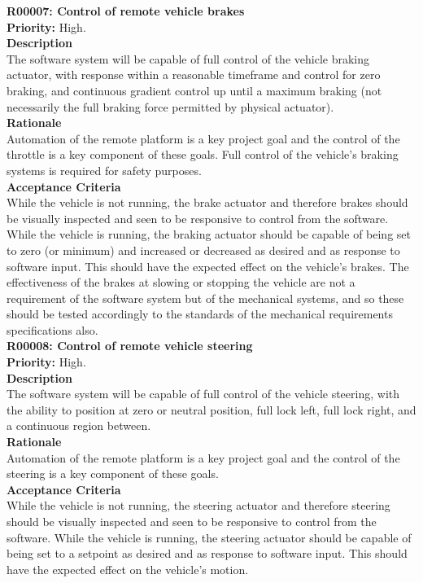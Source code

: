 \documentclass[main.tex]{subfiles}
\begin{document}
\begin{appendices}
\textbf{R00007: Control of remote vehicle brakes}\\
\textbf{Priority: }High.\\
\textbf{Description}\\
The software system will be capable of full control of the vehicle braking actuator, with response within a reasonable timeframe and control for zero braking, and continuous gradient control up until a maximum braking (not necessarily the full braking force permitted by physical actuator).\\
\textbf{Rationale}\\
Automation of the remote platform is a key project goal and the control of the throttle is a key component of these goals. Full control of the vehicle’s braking systems is required for safety purposes.\\
\textbf{Acceptance Criteria}\\
While the vehicle is not running, the brake actuator and therefore brakes should be visually inspected and seen to be responsive to control from the software. While the vehicle is running, the braking actuator should be capable of being set to zero (or minimum) and increased or decreased as desired and as response to software input. This should have the expected effect on the vehicle’s brakes. The effectiveness of the brakes at slowing or stopping the vehicle are not a requirement of the software system but of the mechanical systems, and so these should be tested accordingly to the standards of the mechanical requirements specifications also.\\

\textbf{R00008: Control of remote vehicle steering}\\
\textbf{Priority:} High.\\
\textbf{Description}\\
The software system will be capable of full control of the vehicle steering, with the ability to position at zero or neutral position, full lock left, full lock right, and a continuous region between.\\
\textbf{Rationale}\\
Automation of the remote platform is a key project goal and the control of the steering is a key component of these goals.\\
\textbf{Acceptance Criteria}\\
While the vehicle is not running, the steering actuator and therefore steering should be visually inspected and seen to be responsive to control from the software. While the vehicle is running, the steering actuator should be capable of being set to a setpoint as desired and as response to software input. This should have the expected effect on the vehicle’s motion.\\


\end{appendices}
\end{document}
